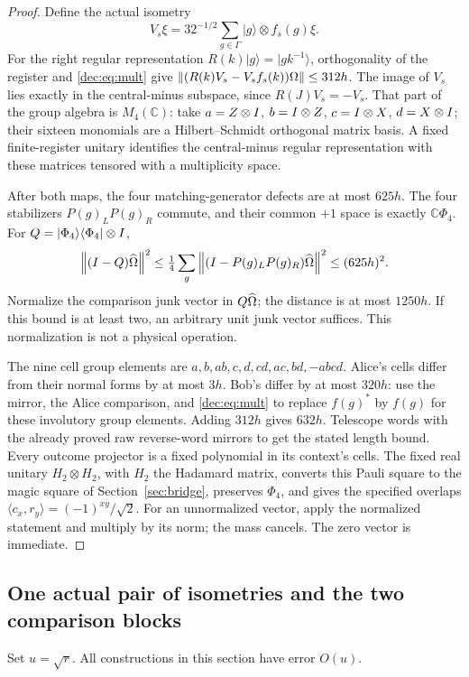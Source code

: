 \begin{proof}
Define the actual isometry
\[
V_s\xi=32^{-1/2}\sum_{g\in\Gamma}|g\rangle\otimes f_s(g)\xi.
\]
For the right regular representation $R(k)|g\rangle=|gk^{-1}\rangle$, orthogonality of the register and \eqref{dec:eq:mult} give
$\left\lVert(R(k)V_s-V_sf_s(k))\Omega\right\rVert\le312h$.
The image of $V_s$ lies exactly in the central-minus subspace, since $R(J)V_s=-V_s$. That part of the group algebra is $M_4(\mathbb C)$: take
$a=Z\otimes I$, $b=I\otimes Z$, $c=I\otimes X$, $d=X\otimes I$; their sixteen monomials are a Hilbert--Schmidt orthogonal matrix basis. A fixed finite-register unitary identifies the central-minus regular representation with these matrices tensored with a multiplicity space.

After both maps, the four matching-generator defects are at most $625h$. The four stabilizers $P(g)_LP(g)_R$ commute, and their common $+1$ space is exactly $\mathbb C\Phi_4$. For $Q=|\Phi_4\rangle\langle\Phi_4|\otimes I$,
\[
\left\lVert(I-Q)\widehat{\Omega}\right\rVert^2
\le\tfrac14\sum_g\left\lVert(I-P(g)_LP(g)_R)\widehat{\Omega}\right\rVert^2
\le(625h)^2.
\]
Normalize the comparison junk vector in $Q\widehat{\Omega}$; the distance is at most $1250h$. If this bound is at least two, an arbitrary unit junk vector suffices. This normalization is not a physical operation.

The nine cell group elements are $a,b,ab,c,d,cd,ac,bd,-abcd$. Alice's cells differ from their normal forms by at most $3h$. Bob's differ by at most $320h$: use the mirror, the Alice comparison, and \eqref{dec:eq:mult} to replace $f(g)^*$ by $f(g)$ for these involutory group elements. Adding $312h$ gives $632h$. Telescope words with the already proved raw reverse-word mirrors to get the stated length bound. Every outcome projector is a fixed polynomial in its context's cells. The fixed real unitary $H_2\otimes H_2$, with $H_2$ the Hadamard matrix, converts this Pauli square to the magic square of Section~\ref{sec:bridge}, preserves $\Phi_4$, and gives the specified overlaps $\langle c_x,r_y\rangle=(-1)^{xy}/\sqrt2$. For an unnormalized vector, apply the normalized statement and multiply by its norm; the mass cancels. The zero vector is immediate.
\end{proof}

\subsection{One actual pair of isometries and the two comparison blocks}\label{dec:sec:geometry}
Set $u=\sqrt r$. All constructions in this section have error $O(u)$.

